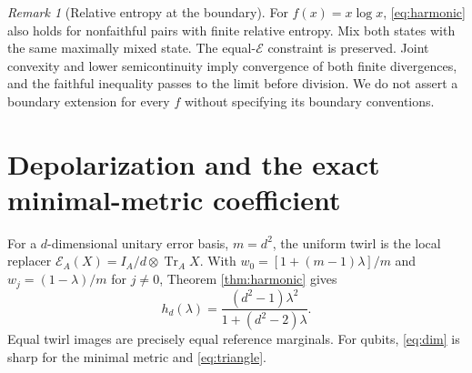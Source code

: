 \documentclass[11pt]{article}
\newcommand{\Tr}{\operatorname{Tr}}
\newcommand{\E}{\mathcal E}
\theoremstyle{remark}
\newtheorem{remark}[theorem]{Remark}
\begin{document}
\begin{remark}[Relative entropy at the boundary]\label{rem:kl}
For \(f(x)=x\log x\), \eqref{eq:harmonic} also holds for nonfaithful pairs with finite relative entropy. Mix both states with the same maximally mixed state. The equal-\(\E\) constraint is preserved. Joint convexity and lower semicontinuity imply convergence of both finite divergences, and the faithful inequality passes to the limit before division. We do not assert a boundary extension for every \(f\) without specifying its boundary conventions.
\end{remark}

\section{Depolarization and the exact minimal-metric coefficient}
For a \(d\)-dimensional unitary error basis, \(m=d^2\), the uniform twirl is the local replacer
\(\E_A(X)=I_A/d\otimes\Tr_AX\).
With
\(w_0=[1+(m-1)\lambda]/m\) and
\(w_j=(1-\lambda)/m\) for \(j\ne0\),
Theorem \ref{thm:harmonic} gives
\begin{equation}\label{eq:dim}
 h_d(\lambda)=\frac{(d^2-1)\lambda^2}{1+(d^2-2)\lambda}.
\end{equation}
Equal twirl images are precisely equal reference marginals.
For qubits, \eqref{eq:dim} is sharp for the minimal metric and \eqref{eq:triangle}.
\end{document}
